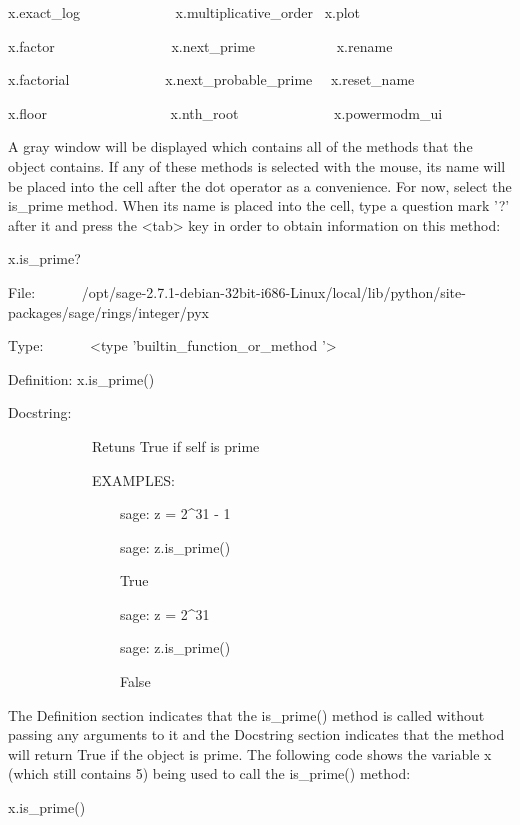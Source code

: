 \documentclass[12pt,oneside]{book}
\begin{document}
x.exact\_log \ \ \ \ \ \ \ \ \ \ \ \ \ x.multiplicative\_order \ x.plot

x.factor \ \ \ \ \ \ \ \ \ \ \ \ \ \ \ \ x.next\_prime
\ \ \ \ \ \ \ \ \ \ \ x.rename

x.factorial \ \ \ \ \ \ \ \ \ \ \ \ \ x.next\_probable\_prime
\ \ x.reset\_name

x.floor \ \ \ \ \ \ \ \ \ \ \ \ \ \ \ \ \ x.nth\_root
\ \ \ \ \ \ \ \ \ \ \ \ \ x.powermodm\_ui


A gray window will be displayed which contains all of the methods that the object contains. If any of these methods is selected with the mouse, its name will be placed into the cell after the dot operator as a convenience. For now, select the is\_prime method. When its name is placed into the cell, type a question mark '?' after it and press the {\textless}tab{\textgreater} key in order to obtain information on this method: 

x.is\_prime?

{\textbar}

File:
\ \ \ \ \ \ /opt/sage{}-2.7.1{}-debian{}-32bit{}-i686{}-Linux/local/lib/python/site{}-packages/sage/rings/integer/pyx

Type: \ \ \ \ \ \ {\textless}type 'builtin\_function\_or\_method '{\textgreater}

Definition: x.is\_prime()


Docstring: 


\ \ \ \ \ \ \ \ \ \ \ \ Retuns True if self is prime 


\ \ \ \ \ \ \ \ \ \ \ \ EXAMPLES: 

\ \ \ \ \ \ \ \ \ \ \ \ \ \ \ \ sage: z = 2\^{}31 {}- 1 

\ \ \ \ \ \ \ \ \ \ \ \ \ \ \ \ sage: z.is\_prime() 

\ \ \ \ \ \ \ \ \ \ \ \ \ \ \ \ True 

\ \ \ \ \ \ \ \ \ \ \ \ \ \ \ \ sage: z = 2\^{}31 

\ \ \ \ \ \ \ \ \ \ \ \ \ \ \ \ sage: z.is\_prime() 

\ \ \ \ \ \ \ \ \ \ \ \ \ \ \ \ False 


The Definition section indicates that the is\_prime() method is called without passing any arguments to it and the Docstring section indicates that the method will return True if the object is prime. The following code shows the variable x (which still contains 5) being used to call the is\_prime() method: 

x.is\_prime()

{\textbar}
\end{document}
